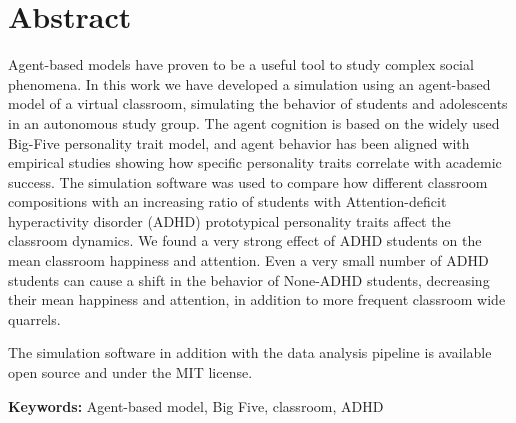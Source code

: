 \chapter{Abstract}

Agent-based models have proven to be a useful tool to study complex social phenomena.
In this work we have developed a simulation using an agent-based model of a virtual
classroom, simulating the behavior of students and adolescents in an autonomous
study group. The agent cognition is based on the widely used Big-Five personality
trait model, and agent behavior has been aligned with empirical studies showing
how specific personality traits correlate with academic success. The simulation
software was used to compare how different classroom compositions with an increasing
ratio of students with Attention-deficit hyperactivity disorder (ADHD) prototypical
personality traits affect the classroom dynamics. We found a very strong effect
of ADHD students on the mean classroom happiness and attention. Even a very small
number of ADHD students can cause a shift in the behavior of None-ADHD students,
decreasing their mean happiness and attention, in addition to more frequent classroom
wide quarrels.


\bb

The simulation software in addition with the data analysis pipeline is available
open source and under the MIT license. 

\bb

{\bf Keywords:} Agent-based model, Big Five, classroom, ADHD